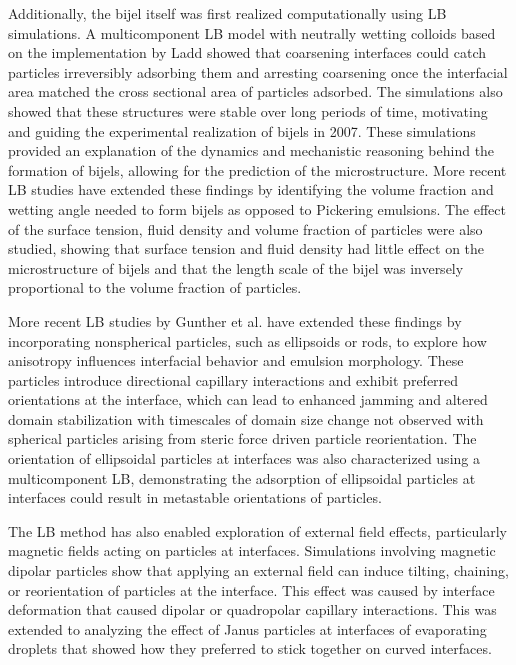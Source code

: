 Additionally, the bijel itself was first realized computationally using LB simulations. \cite{stratford_colloidal_2005} A multicomponent LB model with neutrally wetting colloids based on the implementation
by Ladd showed that coarsening interfaces could catch particles irreversibly adsorbing them and arresting coarsening once the interfacial area matched the cross sectional area of particles adsorbed. 
\cite{stratford_colloidal_2005,ladd_numerical_1994} The simulations also showed that these structures were stable over long periods of time, motivating and guiding the experimental realization of 
bijels in 2007. \cite{herzig_bicontinuous_2007} These simulations provided an explanation of the dynamics and mechanistic reasoning behind the formation of bijels, allowing for the prediction of
the microstructure. More recent LB studies have extended these findings by identifying the volume fraction and wetting angle needed to form bijels as opposed to Pickering emulsions. \cite{jansen_bijels_2011} 
The effect of the surface tension, fluid density and volume fraction of particles were also studied, showing that surface tension and fluid density had little effect on the microstructure of bijels 
and that the length scale of the bijel was inversely proportional to the volume fraction of particles. \cite{jansen_bijels_2011}

More recent LB studies by Gunther et al. have extended these findings by incorporating nonspherical particles, such as ellipsoids or rods, to explore how anisotropy influences interfacial behavior 
and emulsion morphology. \cite{gunther_timescales_2014}
These particles introduce directional capillary interactions and exhibit preferred orientations at the interface, which can lead to enhanced jamming and altered domain stabilization with timescales 
of domain size change not observed with spherical particles arising from steric force driven particle reorientation. The orientation of ellipsoidal particles at interfaces was also characterized using
a multicomponent LB, demonstrating the adsorption of ellipsoidal particles at interfaces could result in metastable orientations of particles. \cite{gunther_lattice_2013}

The LB method has also enabled exploration of external field effects, particularly magnetic fields acting on particles at interfaces. Simulations involving magnetic dipolar particles show that 
applying an external field can induce tilting, chaining, or reorientation of particles at the interface. \cite{davies_interface_2014, davies_assembling_2014} This effect was caused by interface deformation
that caused dipolar or quadropolar capillary interactions. This was extended to analyzing the effect of Janus particles at interfaces of evaporating droplets that showed how they preferred to stick together
on curved interfaces. \cite{xie_direct_2017}

